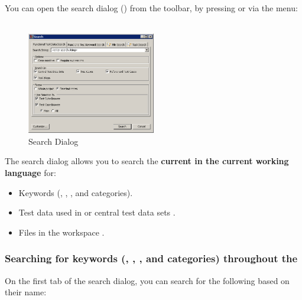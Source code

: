 You can open the search dialog () from the toolbar, by pressing  or via the menu:\\
\\

\begin{figure}[h]
\begin{center}
\includegraphics[width=0.50\textwidth]{Tasks/Searching/PS/SearchDialog}
\caption{Search Dialog}
\label{SearchDialog}
\end{center}
\end{figure}

The search dialog allows you to search the \textbf{current \gdproject{} in the  current working language} for:

\begin{itemize}
\item Keywords  (\gdcases{}, \gdsteps{}, \gdsuites{}, \gdjobs{} and categories).
\item Test data used in \gdcases{} or central test data sets .
\item Files in the workspace .
\end{itemize}


\subsubsection{Searching for keywords (\gdcases{}, \gdsteps{}, \gdsuites{}, \gdjobs{} and categories) throughout the \gdproject{}}
\label{TasksSearchKeywords}

On the first tab of the search dialog, you can search for the following based on their name:

